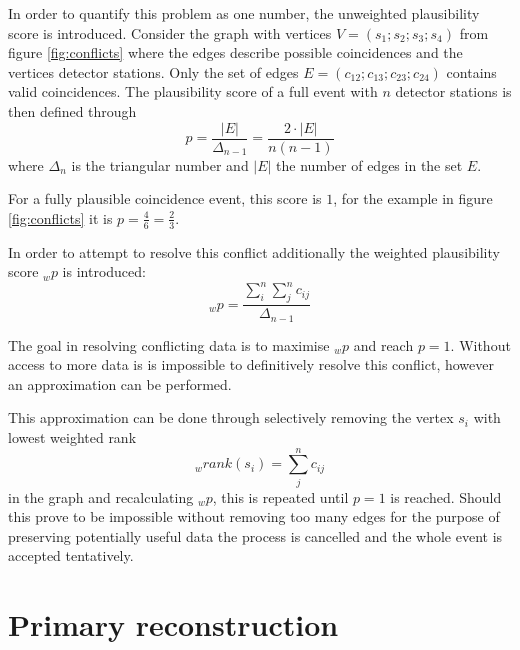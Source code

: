 \documentclass[abstract,toc,los,lof,english,10pt,glossary,acronyms]{jluthesis}
\begin{document}
In order to quantify this problem as one number, the unweighted plausibility score is introduced. Consider the graph with vertices $V = (s_1; s_2; s_3; s_4)$ from figure \ref{fig:conflicts} where the edges describe possible coincidences and the vertices detector stations. Only the set of edges $E = (c_{12}; c_{13}; c_{23}; c_{24})$ contains valid coincidences. The plausibility score of a full event with $n$ detector stations is then defined through
\begin{equation}
p = \frac{|E|}{\Delta_{n-1}}=\frac{2\cdot|E|}{n(n-1)}
\end{equation}
where $\Delta_n$ is the triangular number and $|E|$ the number of edges in the set $E$.

For a fully plausible coincidence event, this score is $1$, for the example in figure \ref{fig:conflicts} it is $p = \frac{4}{6}=\frac{2}{3}$.

In order to attempt to resolve this conflict additionally the weighted plausibility score $_wp$ is introduced:
\begin{equation}
	_wp = \frac{\sum^{n}_{i}\sum^{n}_{j} c_{ij}}{\Delta_{n-1}}
\end{equation}

The goal in resolving conflicting data is to maximise $_wp$ and reach $p=1$. Without access to more data is is impossible to definitively resolve this conflict, however an approximation can be performed.

This approximation can be done through selectively removing the vertex $s_i$ with lowest weighted rank
\begin{equation}
_wrank(s_i) = \sum_{j}^{n}c_{ij}
\end{equation}
in the graph and recalculating $_wp$, this is repeated until $p=1$ is reached. Should this prove to be impossible without removing too many edges for the purpose of preserving potentially useful data the process is cancelled and the whole event is accepted tentatively.

\section{Primary reconstruction}\label{sec:reconstruction}
\end{document}
